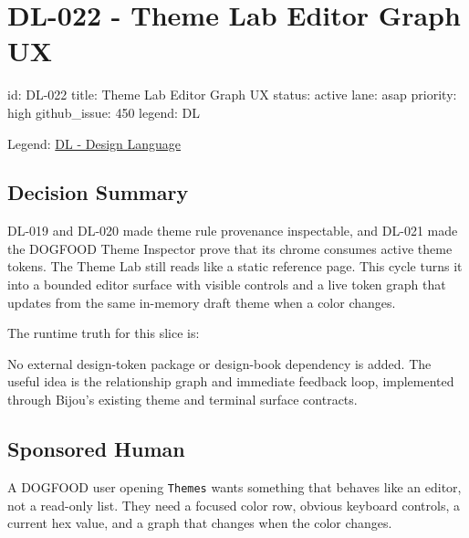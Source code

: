 \chapter{DL-022 - Theme Lab Editor Graph UX}\label{record-187}

\smallskip

\begin{RecordMeta}
id: DL-022
title: Theme Lab Editor Graph UX
status: active
lane: asap
priority: high
github_issue: 450
legend: DL

\end{RecordMeta}

Legend: \href{https://github.com/flyingrobots/bijou/blob/1853ad902f6bf219326409e7f743a5a1d6517dbc/docs/legends/DL-design-language.md}{DL - Design Language}

\section{Decision Summary}\label{record-187-decision-summary}

DL-019 and DL-020 made theme rule provenance inspectable, and DL-021 made the DOGFOOD Theme Inspector prove that its chrome consumes active theme tokens. The Theme Lab still reads like a static reference page. This cycle turns it into a bounded editor surface with visible controls and a live token graph that updates from the same in-memory draft theme when a color changes.

The runtime truth for this slice is:



No external design-token package or design-book dependency is added. The useful idea is the relationship graph and immediate feedback loop, implemented through Bijou's existing theme and terminal surface contracts.

\section{Sponsored Human}\label{record-187-sponsored-human}

A DOGFOOD user opening \texttt{T\allowbreak{}h\allowbreak{}e\allowbreak{}m\allowbreak{}e\allowbreak{}s} wants something that behaves like an editor, not a read-only list. They need a focused color row, obvious keyboard controls, a current hex value, and a graph that changes when the color changes.

